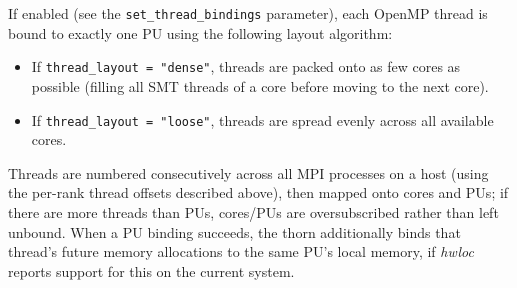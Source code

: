If enabled (see the \texttt{set\_thread\_bindings} parameter), each
OpenMP thread is bound to exactly one PU using the following layout
algorithm:
\begin{itemize}
\item If \texttt{thread\_layout = "dense"}, threads are packed onto as
  few cores as possible (filling all SMT threads of a core before
  moving to the next core).
\item If \texttt{thread\_layout = "loose"}, threads are spread evenly
  across all available cores.
\end{itemize}
Threads are numbered consecutively across all MPI processes on a host
(using the per-rank thread offsets described above), then mapped onto
cores and PUs; if there are more threads than PUs, cores/PUs are
oversubscribed rather than left unbound. When a PU binding succeeds,
the thorn additionally binds that thread's future memory allocations
to the same PU's local memory, if \emph{hwloc} reports support for
this on the current system.

